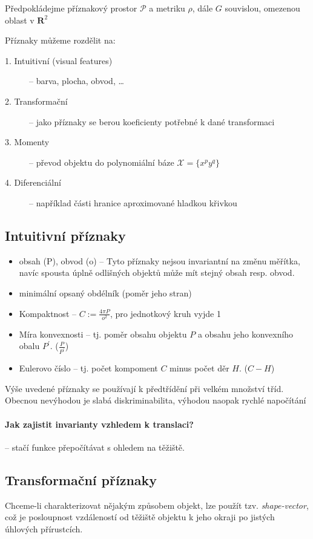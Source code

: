 \def\R{\mathbf{R}}
Předpokládejme příznakový prostor $\mathcal{P}$ a metriku $\rho$, dále $G$ souvislou, omezenou oblast v $\R^2$

Příznaky můžeme rozdělit na:
\begin{description}
	\item[1. Intuitivní (visual features)] -- barva, plocha, obvod, \dots
	\item[2. Transformační] -- jako příznaky se berou koeficienty potřebné k dané transformaci
	\item[3. Momenty ] -- převod objektu do polynomiální báze $\mathcal{X}=\{x^py^q\}$
	\item[4. Diferenciální] -- například části hranice aproximované hladkou křivkou
\end{description}

\subsection{Intuitivní příznaky}
\begin{itemize}
	\item obsah (P), obvod (o) -- Tyto příznaky nejsou invariantní na změnu měřítka,
	navíc spousta úplně odlišných objektů může mít stejný obsah resp. obvod.
	\item minimální opsaný obdélník (poměr jeho stran)
	\item Kompaktnost -- $C:=\frac{4\pi P}{o^2}$, pro jednotkový kruh vyjde 1
	\item Míra konvexnosti -- tj. poměr obsahu objektu $P$ a obsahu jeho konvexního obalu $P^\prime$. ($\frac{P}{P^\prime}$)
	\item Eulerovo číslo -- tj. počet kompoment $C$ minus počet děr $H$. ($C-H$)
\end{itemize}
Výše uvedené příznaky se používají k předtřídění při velkém množství tříd. Obecnou nevýhodou je slabá diskriminabilita,
výhodou naopak rychlé napočítání

\paragraph{Jak zajistit invarianty vzhledem k translaci?} -- stačí funkce přepočítávat s ohledem na těžiště.

\subsection{Transformační příznaky}
Chceme-li charakterizovat nějakým způsobem objekt, lze použít tzv. \emph{shape-vector}, což je posloupnost vzdáleností
od těžiště objektu k jeho okraji po jistých úhlových přírustcích. 

